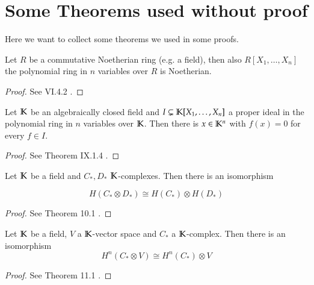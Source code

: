 \appendix
\section{Some Theorems used without proof}

Here we want to collect some theorems we used in some proofs.

\begin{Theorem}
\label{thm:HilbertBasisTheorem}
  Let $R$ be a commutative Noetherian ring (e.g. a field), then also $R[X_1, \ldots, X_n]$ the polynomial 
  ring in $n$ variables over $R$ is Noetherian.
\end{Theorem}
\begin{proof}
 See \cite{Lang2002} VI.4.2 .
\end{proof}



\begin{Theorem}
\label{thm:Nullstellensatz}
 Let $\mathbb{K}$ be an algebraically closed field and \newline $I \subsetneq \mathbb{K}[ X_1, \ldots, X_n]$ 
 a proper ideal in the polynomial ring in $n$ variables over $\mathbb{K}$. Then there is $x \in \mathbb{K}^n$
 with $f(x) = 0$ for every $f \in I$.
\end{Theorem}
\begin{proof}
 See \cite{Lang2002} Theorem IX.1.4 .
\end{proof}


\begin{Theorem}
 \label{thm:KünnethTheorem}
 
 Let $\mathbb{K}$ be a field and $C_* , D_*$ $\mathbb{K}$-complexes. Then there is an isomorphism
 
 $$H( C_* \otimes D_* ) \cong H(C_*) \otimes H(D_*)$$
 
\end{Theorem}
\begin{proof}
 See \cite{MacLane1963} Theorem 10.1 .
\end{proof}

\begin{Theorem}
\label{thm:Universalcoefficients}
 Let $\mathbb{K}$ be a field, $V$ a $\mathbb{K}$-vector space and $C_*$ a $\mathbb{K}$-complex. Then there is an isomorphism
 $$H^n(C_* \otimes V) \cong H^n(C_*) \otimes V$$
\end{Theorem}
\begin{proof}
 See \cite{MacLane1963} Theorem 11.1 .
\end{proof}
